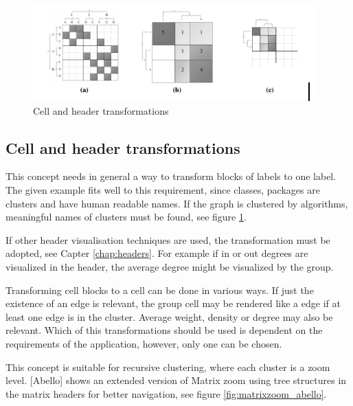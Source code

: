 \begin{figure}[h]
\centering
\includegraphics{images/matrixzoom_transform}
\caption{Cell and header transformations \citep{ham-ivis-2003} \label{fig:matrixzoom_transform}}
\end{figure}




\subsection{Cell and header transformations}   
This concept needs in general a way to transform blocks of labels to one label. The given example fits well to this requirement, since classes, packages are clusters and have human readable names. If the graph is clustered by algorithms, meaningful names of clusters must be found, see figure \ref{fig:matrixzoom_transform}.

If other header visualisation techniques are used, the transformation must be adopted, see Capter \ref{chap:headers}. For example if in or out degrees are visualized in the header, the average degree might be visualized by the group.

Transforming cell blocks to a cell can be done in various ways. If just the existence of an edge is relevant, the group cell may be rendered like a edge if at least one edge is in the cluster. Average weight, density or degree may also be relevant. Which of this transformations should be used is dependent on the requirements of the application, however, only one can be chosen.

This concept is suitable for recursive clustering, where each cluster is a zoom level. [Abello] shows an extended version of Matrix zoom using tree structures in the matrix headers for better navigation, see figure \ref{fig:matrixzoom_abello}.

